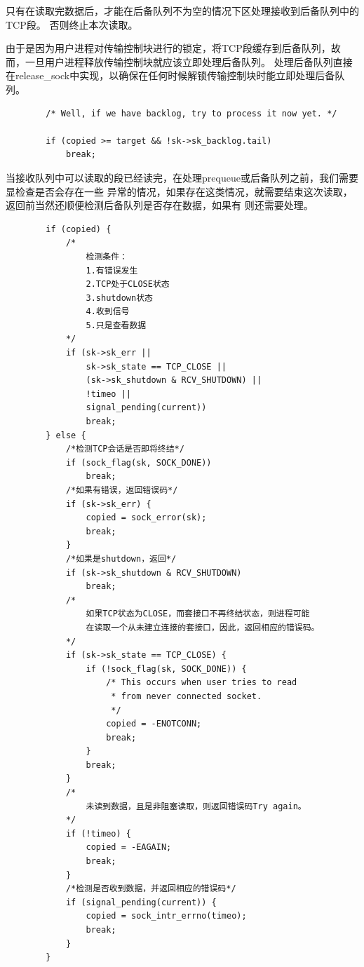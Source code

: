 	只有在读取完数据后，才能在后备队列不为空的情况下区处理接收到后备队列中的TCP段。
	否则终止本次读取。

	由于是因为用户进程对传输控制块进行的锁定，将TCP段缓存到后备队列，故而，一旦用户进程释放传输控制块就应该立即处理后备队列。
	处理后备队列直接在release\_sock中实现，以确保在任何时候解锁传输控制块时能立即处理后备队列。
\begin{verbatim}
		/* Well, if we have backlog, try to process it now yet. */

		if (copied >= target && !sk->sk_backlog.tail)
			break;
\end{verbatim}

	当接收队列中可以读取的段已经读完，在处理prequeue或后备队列之前，我们需要显检查是否会存在一些
	异常的情况，如果存在这类情况，就需要结束这次读取，返回前当然还顺便检测后备队列是否存在数据，如果有
	则还需要处理。	
\begin{verbatim}
		if (copied) {
			/*
				检测条件：
				1.有错误发生
				2.TCP处于CLOSE状态
				3.shutdown状态
				4.收到信号
				5.只是查看数据
			*/			
			if (sk->sk_err ||
			    sk->sk_state == TCP_CLOSE ||
			    (sk->sk_shutdown & RCV_SHUTDOWN) ||
			    !timeo ||
			    signal_pending(current))
				break;
		} else {
			/*检测TCP会话是否即将终结*/
			if (sock_flag(sk, SOCK_DONE))
				break;
			/*如果有错误，返回错误码*/
			if (sk->sk_err) {
				copied = sock_error(sk);
				break;
			}
			/*如果是shutdown，返回*/
			if (sk->sk_shutdown & RCV_SHUTDOWN)
				break;
			/*
				如果TCP状态为CLOSE，而套接口不再终结状态，则进程可能
				在读取一个从未建立连接的套接口，因此，返回相应的错误码。
			*/
			if (sk->sk_state == TCP_CLOSE) {
				if (!sock_flag(sk, SOCK_DONE)) {
					/* This occurs when user tries to read
					 * from never connected socket.
					 */
					copied = -ENOTCONN;
					break;
				}
				break;
			}
			/*
				未读到数据，且是非阻塞读取，则返回错误码Try again。
			*/
			if (!timeo) {
				copied = -EAGAIN;
				break;
			}
			/*检测是否收到数据，并返回相应的错误码*/
			if (signal_pending(current)) {
				copied = sock_intr_errno(timeo);
				break;
			}
		}
\end{verbatim}

